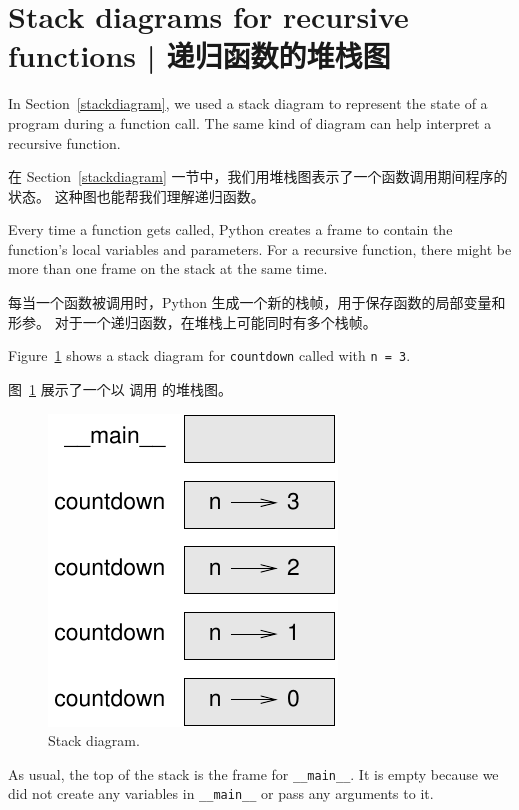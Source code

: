 {{{{\section{Stack diagrams for recursive functions  |  递归函数的堆栈图}
\label{recursive.stack}
    

In Section~\ref{stackdiagram}, we used a stack diagram to represent
the state of a program during a function call.  The same kind of
diagram can help interpret a recursive function.

在 Section~\ref{stackdiagram} 一节中，我们用堆栈图表示了一个函数调用期间程序的状态。
这种图也能帮我们理解递归函数。

Every time a function gets called, Python creates a
frame to contain the function's local variables and parameters.
For a recursive function, there might be more than one frame on the
stack at the same time.

每当一个函数被调用时，Python 生成一个新的栈帧，用于保存函数的局部变量和形参。
对于一个递归函数，在堆栈上可能同时有多个栈帧。

Figure~\ref{fig.stack2} shows a stack diagram for {\tt countdown} called with
{\tt n = 3}.

图~\ref{fig.stack2} 展示了一个以  调用  的堆栈图。

\begin{figure}
\centerline
{\includegraphics[scale=0.8]{../source/figs/stack2.pdf}}
\caption{Stack diagram.}
\label{fig.stack2}
\end{figure}


As usual, the top of the stack is the frame for \verb"__main__".
It is empty because we did not create any variables in
\verb"__main__" or pass any arguments to it.
  

}}}}
